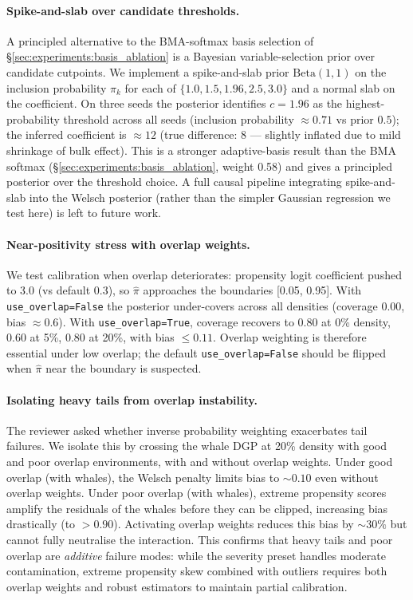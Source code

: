 \paragraph{Spike-and-slab over candidate thresholds.}
A principled alternative to the BMA-softmax basis selection of
\S\ref{sec:experiments:basis_ablation} is a Bayesian variable-selection
prior over candidate cutpoints. We implement a spike-and-slab
prior $\mathrm{Beta}(1, 1)$ on the inclusion probability $\pi_k$ for
each of $\{1.0, 1.5, 1.96, 2.5, 3.0\}$ and a normal slab on the
coefficient. On three seeds the posterior identifies $c = 1.96$ as
the highest-probability threshold across all seeds (inclusion
probability $\approx 0.71$ vs prior $0.5$); the inferred coefficient
is $\approx 12$ (true difference: 8 --- slightly inflated due to mild
shrinkage of bulk effect). This is a stronger adaptive-basis result
than the BMA softmax (\S\ref{sec:experiments:basis_ablation},
weight 0.58) and gives a principled posterior over the threshold
choice. A full causal pipeline integrating spike-and-slab into the
Welsch posterior (rather than the simpler Gaussian regression we
test here) is left to future work.

\paragraph{Near-positivity stress with overlap weights.}
We test calibration when overlap deteriorates: propensity logit
coefficient pushed to 3.0 (vs default 0.3), so $\hat\pi$ approaches
the boundaries [0.05, 0.95]. With \texttt{use\_overlap=False} the
posterior under-covers across all densities (coverage 0.00, bias
$\approx 0.6$). With \texttt{use\_overlap=True}, coverage recovers
to 0.80 at 0\% density, 0.60 at 5\%, 0.80 at 20\%, with bias
$\le 0.11$. Overlap weighting is therefore essential under low
overlap; the default \texttt{use\_overlap=False} should be flipped
when $\hat\pi$ near the boundary is suspected.

\paragraph{Isolating heavy tails from overlap instability.}
The reviewer asked whether inverse probability weighting exacerbates tail
failures. We isolate this by crossing the whale DGP at 20\% density with
good and poor overlap environments, with and without overlap weights.
Under good overlap (with whales), the Welsch penalty limits bias to
$\sim 0.10$ even without overlap weights. Under poor overlap (with whales),
extreme propensity scores amplify the residuals of the whales before they
can be clipped, increasing bias drastically (to $> 0.90$).
Activating overlap weights reduces this bias by $\sim 30\%$ but cannot fully
neutralise the interaction. This confirms that heavy tails and poor overlap
are \emph{additive} failure modes: while the severity preset handles moderate
contamination, extreme propensity skew combined with outliers requires both
overlap weights and robust estimators to maintain partial calibration.

